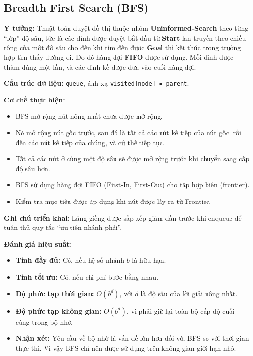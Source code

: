 \subsection{Breadth First Search (BFS)}
\textbf{Ý tưởng:} Thuật toán duyệt đồ thị thuộc nhóm \textbf{Uninformed-Search} theo từng “lớp” độ sâu, tức là các đỉnh được duyệt bắt đầu từ \textbf{Start} lan truyền theo chiều rộng của một độ sâu cho đến khi tìm đến được \textbf{Goal} thì kết thúc trong trường hợp tìm thấy đường đi. Do đó hàng đợi \textbf{FIFO} được sử dụng. Mỗi đỉnh được thăm đúng một lần, và các đỉnh kề được đưa vào cuối hàng đợi.

\textbf{Cấu trúc dữ liệu:} \texttt{queue}, ánh xạ \texttt{visited[node] = parent}. 

\textbf{Cơ chế thực hiện:} \cite{lecture2025}
\begin{itemize}
    \item BFS mở rộng nút nông nhất chưa được mở rộng.
    \item Nó mở rộng nút gốc trước, sau đó là tất cả các nút kế tiếp của nút gốc, rồi đến các nút kế tiếp của chúng, và cứ thế tiếp tục.
    \item Tất cả các nút ở cùng một độ sâu sẽ được mở rộng trước khi chuyển sang cấp độ sâu hơn.
    \item BFS sử dụng hàng đợi FIFO (First-In, First-Out) cho tập hợp biên (frontier).
    \item Kiểm tra mục tiêu được áp dụng khi nút được lấy ra từ Frontier.
\end{itemize}

\textbf{Ghi chú triển khai:} Láng giềng được sắp xếp giảm dần trước khi enqueue để tuân thủ quy tắc “ưu tiên nhánh phải”.

\textbf{Đánh giá hiệu suất:} \cite{lecture2025}
\begin{itemize}
    \item \textbf{Tính đầy đủ:} Có, nếu hệ số nhánh $b$ là hữu hạn.
    \item \textbf{Tính tối ưu:} Có, nếu chi phí bước bằng nhau.
    \item \textbf{Độ phức tạp thời gian:} $O(b^d)$, với $d$ là độ sâu của lời giải nông nhất.
    \item \textbf{Độ phức tạp không gian:} $O(b^d)$, vì phải giữ lại toàn bộ cấp độ cuối cùng trong bộ nhớ.
    \item \textbf{Nhận xét:} Yêu cầu về bộ nhớ là vấn đề lớn hơn đối với BFS so với thời gian thực thi. Vì vậy BFS chỉ nên được sử dụng trên không gian giới hạn nhỏ.
\end{itemize}


